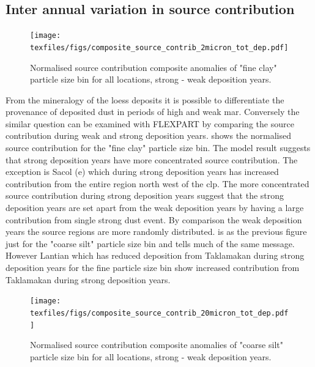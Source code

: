 \subsection{Inter annual variation in source contribution}
\begin{figure}[hptb]
    \centering
    \texttt{[image: texfiles/figs/composite\_source\_contrib\_2micron\_tot\_dep.pdf]}
    \caption{Normalised source contribution composite anomalies of "fine clay" particle size bin for all locations, strong - weak deposition years.}
    \label{fig:source_contrib2mmu_anomalies}
\end{figure}
From the mineralogy of the loess deposits it is possible to differentiate the provenance of deposited dust in periods of high and weak \acrshort{mar}. Conversely the similar question can be examined with FLEXPART by comparing the source contribution during weak and strong deposition years.  
 shows the normalised source contribution for the "fine clay" particle size bin. The model result suggests that strong deposition years have more concentrated source contribution. The exception is Sacol (e) which during strong deposition years has increased contribution from the entire region north west of the \acrshort{clp}. The more concentrated source contribution during strong deposition years suggest that the strong deposition years are set apart from the weak deposition years by having a large contribution from single strong dust event. By comparison the weak deposition years the source regions are more randomly distributed.  is as the previous figure just for the "coarse silt" particle size bin and tells much of the same message. However Lantian which has reduced  deposition from Taklamakan during strong deposition years for the fine particle size bin show increased contribution from Taklamakan during strong deposition years.      
\begin{figure}[hptb]
    \centering
    \texttt{[image: texfiles/figs/composite\_source\_contrib\_20micron\_tot\_dep.pdf]}
    \caption{Normalised source contribution composite anomalies of "coarse silt" particle size bin for all locations, strong - weak deposition years.}
    \label{fig:source_contrib20mmu_anomalies}
\end{figure}

